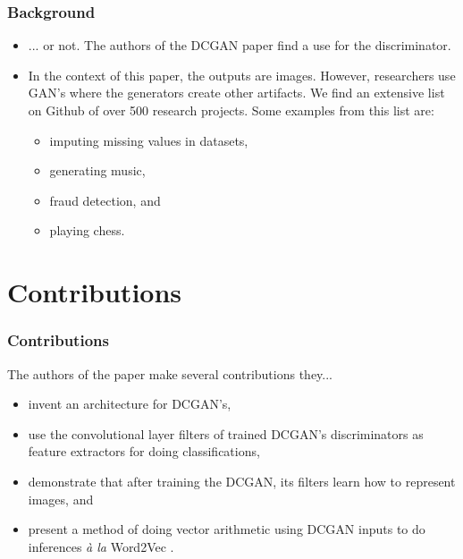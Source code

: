 \documentclass{beamer}
\begin{document}
\begin{frame}
\frametitle{Background}
\begin{itemize}

\item ... or not.  The authors of the DCGAN paper find a use for the discriminator.
  \item In the context of this paper, the outputs are images.  However, 
   researchers use GAN's where the generators create other artifacts. We find
   an extensive list on Github  \cite{ganList} of over 500 research projects. 
   Some examples from this list are:
  \begin{itemize}
    \item imputing missing values in datasets,
    \item generating music,
    \item fraud detection, and
    \item playing chess.
  \end{itemize}
\end{itemize}
\end{frame}


\section{Contributions}
\begin{frame}
\frametitle{Contributions}

The authors of the paper make several contributions they...
\begin{itemize}
  \item invent an architecture for DCGAN's,
  \item use the convolutional layer filters of trained DCGAN's discriminators as 
    feature extractors for doing classifications,
  \item demonstrate that after training the DCGAN, its filters learn how to
    represent images, and
  \item present a method of doing vector arithmetic using DCGAN inputs to do 
    inferences \emph{{\`a} la} Word2Vec \cite{word2Vec}.
\end{itemize}
\end{frame}
\end{document}
